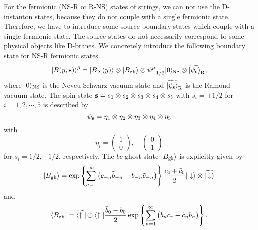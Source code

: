 \documentclass[a4paper,prd,preprint]{revtex4}
\begin{document}
For the fermionic (NS-R or R-NS) states of strings,
 we can not use the D-instanton states,
 because they do not couple with a single fermionic state.
Therefore,
 we have to introduce some source boundary states
 which couple with a single fermionic state.
The source states do not necessarily correspond to
 some physical objects like D-branes.
We concretely introduce the following boundary state
 for NS-R fermionic states.
\begin{equation}
 | B(y,{\bf s}) \rangle^{\hat \mu}
 = | B_X(y) \rangle \otimes | B_{\rm gh} \rangle
 \otimes \psi_{-1/2}^{\hat \mu} | 0 \rangle_{\rm NS}
 \otimes {\widetilde {| {\psi_{\bf s}} \rangle}}_{\rm R},
\end{equation}
 where $| 0 \rangle_{\rm NS}$ is the Neveu-Schwarz vacuum state
 and $\widetilde{ | \psi_{\bf s} \rangle}_{\rm R}$
 is the Ramond vacuum state.
The spin state
 ${\bf s} = s_1 \otimes s_2 \otimes s_3 \otimes s_4 \otimes s_5$
 with $s_i = \pm 1/2$ for $i=1,2,\cdots,5$
 is described by
\begin{equation}
 \psi_{\bf s}
  = \eta_1 \otimes \eta_2 \otimes\eta_3 \otimes \eta_4 \otimes \eta_5
\end{equation}
 with
\begin{equation}
 \eta_i
 = \left( \begin{array}{c} 1 \\ 0 \end{array} \right), \quad
   \left( \begin{array}{c} 0 \\ 1 \end{array} \right)
\end{equation}
 for $s_i=1/2, -1/2$, respectively.
The $bc$-ghost state $| B_{\rm gh} \rangle$ is explicitly given by
\begin{equation}
 | B_{\rm gh} \rangle
 = \exp\left\{
        \sum_{n=1}^\infty
         \left(
         c_{-n} {\tilde b}_{-n} - b_{-n} {\tilde c}_{-n}
         \right)
       \right\}
    {{c_0+{\tilde c}_0} \over 2}
   | \downarrow \rangle \otimes \widetilde{ | \downarrow \rangle}
\end{equation}
and
\begin{equation}
 \langle B_{\rm gh} |
 = \widetilde{ \langle \uparrow |} \otimes \langle \uparrow |
    {{{\tilde b}_0-b_0} \over 2}
        \exp
        \left\{
        \sum_{n=1}^\infty
        \left(
         {\tilde b}_n c_n - {\tilde c}_n b_n
        \right)
        \right\}.
\end{equation}
\end{document}
